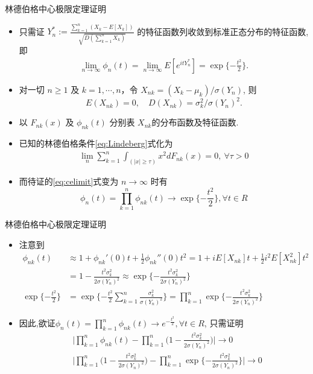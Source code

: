 \documentclass[Prob-All.tex]{subfiles}
\begin{document}
\begin{frame}{林德伯格中心极限定理证明}
\begin{itemize}
	\item 只需证 $Y_n^*:=\frac{\sum_{k=1}^n(X_k-E[X_k])}{\sqrt{D(\sum_{k=1}^nX_k)}}$ 的特征函数列收敛到标准正态分布的特征函数,即
	\begin{align}\label{eq:celimit}
		\lim_{n\rightarrow\infty}\phi_{n}(t)=\lim_{n\rightarrow\infty}E[e^{itY_n^*}]= \exp\{-\frac{t^2}{2}\}.
	\end{align}

    \item 对一切 $n \geq 1$ 及 $k=1, \cdots, n$，令 $X_{nk}=\left(X_{k}-\mu_k\right) / \sigma(Y_n)$, 则
	\[E\left(X_{nk}\right)=0,\quad D\left(X_{nk}\right)=\sigma_k^{2} / \sigma(Y_n)^{2}.\]
	\item 以 $F_{n k}(x)$ 及 $\phi_{n k}(t)$ 分别表 $X_{nk}$的分布函数及特征函数.
		\item 已知的林德伯格条件\eqref{eq:Lindeberg}式化为
		\begin{align}\label{eq:Lindebergcondi-2}
			\lim _{n} \sum_{k=1}^{n} \int_{(|x| \geq \tau)} x^{2} d F_{n k}(x)=0, \ \forall \tau>0
		\end{align}

	\item
		而待证的\eqref{eq:celimit}式变为 $n \rightarrow \infty$ 时有
		\[
		\phi_{n}(t)=\prod_{k=1}^{n} \phi_{n k}(t) \longrightarrow \exp\{-\frac{t^2}{2}\},  \forall t \in R
		\]

\end{itemize}

\end{frame}
\begin{frame}{林德伯格中心极限定理证明}
	\begin{itemize}
		\item 注意到
		\begin{align*}
		  \phi_{nk}(t)&\approx 1+\phi_{nk}'(0)t+\frac{1}{2}\phi_{nk}''(0)t^2=1+iE[X_{nk}]t+\frac{1}{2}i^2E[X_{nk}^2]t^2\\
					&=1-\frac{t^2\sigma_k^2}{2\sigma(Y_n)^2}\approx \exp\{-\frac{t^2\sigma_k^2}{2\sigma(Y_n)^2}\}\\
			\exp\{-\frac{t^2}{2}\}&=\exp\{-\frac{t^2}{2}\sum_{k=1}^n\frac{\sigma_k^2}{\sigma(Y_n)^2}\}=\prod_{k=1}^{n} \exp\{-\frac{t^2\sigma_k^2}{2\sigma(Y_n)^2}\}
		\end{align*}
		\item 因此,欲证$\phi_{n}(t)=\prod_{k=1}^{n} \phi_{n k}(t) \longrightarrow e^{-\frac{t^{2}}{2}},  \forall t \in R$, 只需证明
		\begin{align*}
	&\big|\prod_{k=1}^{n} \phi_{n k}(t)-\prod_{k=1}^{n}\big(1-\frac{t^{2} \sigma_{k}^{2}}{2 \sigma(Y_n)^2}\big)\big| \longrightarrow 0\\
	&\big|\prod_{k=1}^{n}\big(1-\frac{t^{2} \sigma_{k}^{2}}{2 \sigma(Y_n)^2}\big)-\prod_{k=1}^{n} \exp\{-\frac{t^2\sigma_k^2}{2\sigma(Y_n)^2}\}\big| \longrightarrow 0
		\end{align*}
	\end{itemize}


	\end{frame}
\end{document}
